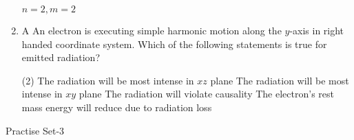\begin{enumerate}
\begin{tasks}
	\task[\textbf{d.}]$n=2, m=2$
\end{tasks}
\item A An electron is executing simple harmonic motion along the $y$-axis in right handed coordinate system. Which of the following statements is true for emitted radiation?
{}
 \begin{tasks}(2)
	\task[\textbf{a.}]The radiation will be most intense in $x z$ plane
	\task[\textbf{b.}] The radiation will be most intense in $x y$ plane
	\task[\textbf{c.}]The radiation will violate causality
	\task[\textbf{d.}] The electron's rest mass energy will reduce due to radiation loss
\end{tasks}
\end{enumerate}



\newpage
\begin{abox}
	Practise Set-3
\end{abox}
